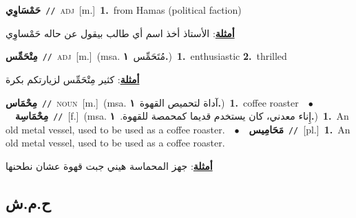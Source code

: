 \documentclass[10pt,a4paper,twoside]{article} %
\begin{document}
\begin{multicols}{2}
{\setlength\topsep{0pt}\textbf{\foreignlanguage{arabic}{حَمْسَاوِي}}\ {\color{gray}\texttt{//}\color{black}}\ \textsc{adj}\ [m.]\ \textbf{1.}~from Hamas (political faction)\  \begin{flushright}\color{gray}\foreignlanguage{arabic}{\textbf{\underline{\foreignlanguage{arabic}{أمثلة}}}: الأستاذ أخذ اسم أي طالب بيقول عن حاله حَمْساوِي}\end{flushright}\color{black}} \vspace{2mm}

{\setlength\topsep{0pt}\textbf{\foreignlanguage{arabic}{مِتْحَمِّس}}\ {\color{gray}\texttt{//}\color{black}}\ \textsc{adj}\ [m.]\ \color{gray}(msa. \foreignlanguage{arabic}{مُتَحَمِّس}~\foreignlanguage{arabic}{\textbf{١.}})\color{black}\ \textbf{1.}~enthusiastic  \textbf{2.}~thrilled\  \begin{flushright}\color{gray}\foreignlanguage{arabic}{\textbf{\underline{\foreignlanguage{arabic}{أمثلة}}}: كثير مِتْحَمِّس لزيارتكم بكرة}\end{flushright}\color{black}} \vspace{2mm}

{\setlength\topsep{0pt}\textbf{\foreignlanguage{arabic}{مِحْمَاس}}\ {\color{gray}\texttt{//}\color{black}}\ \textsc{noun}\ [m.]\ \color{gray}(msa. \foreignlanguage{arabic}{آداة لتحميص القهوة}~\foreignlanguage{arabic}{\textbf{١.}})\color{black}\ \textbf{1.}~coffee roaster\ \ $\bullet$\ \ \setlength\topsep{0pt}\textbf{\foreignlanguage{arabic}{مِحْمَاسِة}}\ {\color{gray}\texttt{//}\color{black}}\ [f.]\ \color{gray}(msa. \foreignlanguage{arabic}{إِناء معدني، كان يستخدم قديما كمحمصة للقهوة.}~\foreignlanguage{arabic}{\textbf{١.}})\color{black}\ \textbf{1.}~An old metal vessel, used to be used as a coffee roaster.\ \ $\bullet$\ \ \setlength\topsep{0pt}\textbf{\foreignlanguage{arabic}{مَحَامِيس}}\ {\color{gray}\texttt{//}\color{black}}\ [pl.]\ \textbf{1.}~An old metal vessel, used to be used as a coffee roaster.\  \begin{flushright}\color{gray}\foreignlanguage{arabic}{\textbf{\underline{\foreignlanguage{arabic}{أمثلة}}}: جهز المحماسة هيني جبت قهوة عشان نطحنها}\end{flushright}\color{black}} \vspace{2mm}

\vspace{-3mm}
\subsection*{\color{blue}\foreignlanguage{arabic}{ح.م.ش}\color{blue}{}} 


\end{multicols}
\end{document}
